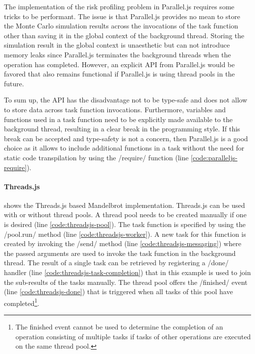 The implementation of the risk profiling problem in Parallel.js requires some tricks to be performant. The issue is that Parallel.js provides no mean to store the Monte Carlo simulation results across the invocations of the task function other than saving it in the global context of the background thread. Storing the simulation result in the global context is unaesthetic but can not introduce memory leaks since Parallel.js terminates the background threads when the operation has completed. However, an explicit API from Parallel.js would be favored that also remains functional if Parallel.js is using thread pools in the future.

To sum up, the API has the disadvantage not to be type-safe and does not allow to store data across task function invocations. Furthermore, variables and functions used in a task function need to be explicitly made available to the background thread, resulting in a clear break in the programming style. If this break can be accepted and type-safety is not a concern, then Parallel.js is a good choice as it allows to include additional functions in a task without the need for static code transpilation by using the \javascriptinline/require/ function (line \ref{code:paralleljs-require}).

\paragraph{Threads.js}
 shows the Threads.js based Mandelbrot implementation. Threads.js can be used with or without thread pools. A thread pool needs to be created manually if one is desired (line \ref{code:threadsjs-pool}). The task function is specified by using the \javascriptinline/pool.run/ method (line \ref{code:threadsjs-worker}). A new task for this function is created by invoking the \javascriptinline/send/ method (line \ref{code:threadsjs-messaging}) where the passed arguments are used to invoke the task function in the background thread. The result of a single task can be retrieved by registering a \javascriptinline/done/ handler (line \ref{code:threadsjs-task-completion}) that in this example is used to join the sub-results of the tasks manually. The thread pool offers the \javascriptinline/finished/ event (line \ref{code:threadsjs-done}) that is triggered when all tasks of this pool have completed\footnote{The finished event cannot be used to determine the completion of an operation consisting of multiple tasks if tasks of other operations are executed on the same thread pool.}.

